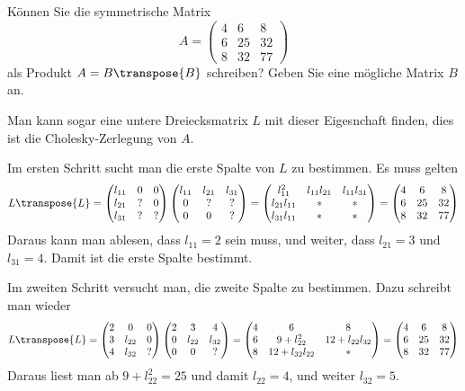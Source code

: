 Können Sie die symmetrische Matrix
\[
A=\begin{pmatrix}
 4& 6& 8\\
 6&25&32\\
 8&32&77
\end{pmatrix}
\]
als Produkt $A=B\transpose{B}$ schreiben? Geben Sie eine mögliche Matrix $B$ an.


\begin{loesung}
Man kann sogar eine untere Dreiecksmatrix $L$ mit dieser Eigesnchaft finden,
dies ist die Cholesky-Zerlegung von $A$.

Im ersten Schritt sucht man die erste Spalte von $L$ zu bestimmen.
Es muss gelten
\[
L\transpose{L}=
\begin{pmatrix}
l_{11}&  0&  0\\
l_{21}&  ?&  0\\
l_{31}&  ?&  ?
\end{pmatrix}
\begin{pmatrix}
l_{11}&l_{21}&l_{31}\\
     0&     ?&     ?\\
     0&     0&     ?
\end{pmatrix}
=
\begin{pmatrix}
    l_{11}^2&l_{11}l_{21}&l_{11}l_{31}\\
l_{21}l_{11}&           *&           *\\
l_{31}l_{11}&           *&           *
\end{pmatrix}
=
\begin{pmatrix}
 4& 6& 8\\
 6&25&32\\
 8&32&77
\end{pmatrix}
\]
Daraus kann man ablesen, dass $l_{11}=2$ sein muss, und weiter,
dass
$l_{21}=3$ und $l_{31}=4$. Damit ist die erste Spalte bestimmt.

Im zweiten Schritt versucht man, die zweite Spalte zu bestimmen.
Dazu schreibt man wieder
\[
L\transpose{L}
=
\begin{pmatrix}
2&     0&0\\
3&l_{22}&0\\
4&l_{32}&?
\end{pmatrix}
\begin{pmatrix}
2&     3&     4\\
0&l_{22}&l_{32}\\
0&     0&?
\end{pmatrix}
=
\begin{pmatrix}
 4&              6&             8\\
 6& 9+l_{22}^2    &12+l_{22}l_{32}\\
 8&12+l_{32}l_{22}&             *
\end{pmatrix}
=
\begin{pmatrix}
 4& 6& 8\\
 6&25&32\\
 8&32&77
\end{pmatrix}
\]
Daraus liest man ab $9+l_{22}^2=25$ und damit $l_{22}=4$, und weiter
$l_{32}=5$.


\end{loesung}
